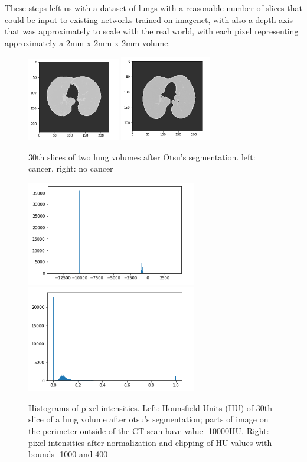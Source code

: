 \documentclass[twocolumn,10pt]{article}
\begin{document}
These steps left us with a dataset of lungs with a reasonable number of slices that could be input to existing networks trained on imagenet, with also a depth axis that was approximately to scale with the real world, with each pixel representing approximately a 2mm x 2mm x 2mm volume. 


\begin{figure}[H]
\label{hounsfield_imgs}
\includegraphics[width=10.9em]{imgs/hounsfield_cancer.png}
\includegraphics[width=10.7em]{imgs/hounsfield_nocancer.png}
\caption{30th slices of two lung volumes after Otsu's segmentation.
left: cancer, right: no cancer}
\end{figure}

\begin{figure}
\label{histograms}
\begin{center}
\includegraphics[width=20em]{imgs/hounsfield_hist.png}
\includegraphics[width=20em]{imgs/visual_crop_hist.png}
\end{center}
\caption{Histograms of pixel intensities. Left: Hounsfield Units (HU) of 30th slice of
a lung volume after otsu's segmentation; parts of image on the perimeter outside
of the CT scan have value -10000HU. Right: pixel intensities after normalization 
and clipping of HU values with bounds -1000 and 400}
\end{figure}
\end{document}
